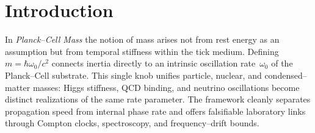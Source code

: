 \section*{Introduction}

In \emph{Planck--Cell Mass} the notion of mass arises not from rest energy as an
assumption but from temporal stiffness within the tick medium.  Defining
$m = \hbar\omega_0/c^2$ connects inertia directly to an intrinsic oscillation
rate~$\omega_0$ of the Planck--Cell substrate.  This single knob unifies particle,
nuclear, and condensed--matter masses: Higgs stiffness, QCD binding, and
neutrino oscillations become distinct realizations of the same rate parameter.
The framework cleanly separates propagation speed from internal phase rate and
offers falsifiable laboratory links through Compton clocks, spectroscopy, and
frequency--drift bounds.
